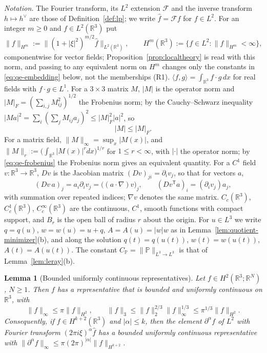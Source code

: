 \documentclass[11pt]{article}
\newtheorem{lemma}[theorem]{Lemma}
\theoremstyle{definition}
\theoremstyle{plain}
\newcommand{\R}{\mathbb R}
\newcommand{\norm}[1]{\lVert #1\rVert}
\begin{document}
\emph{Notation.}  The Fourier transform, its $L^2$ extension $\mathcal F$
and the inverse transform $h\mapsto h^\vee$ are those of
Definition~\ref{def:lp}; we write $\hat f=\mathcal Ff$ for $f\in L^2$.
For an integer $m\ge0$ and $f\in L^2(\R^3)$ put
\begin{equation}\label{eq:qe-sobolev-norm}
 \norm f_{H^m}:=\norm{(1+|\xi|^2)^{m/2}\hat f}_{L^2(\R^3)},
 \qquad H^m(\R^3):=\{f\in L^2:\norm f_{H^m}<\infty\},
\end{equation}
componentwise for vector fields; Proposition~\ref{prop:localtheory} is read
with this norm, and passing to any equivalent norm on $H^m$ changes only the
constants in \eqref{eq:qe-embedding} below, not the memberships (R1).
$\langle f,g\rangle=\int_{\R^3}f\cdot g\,dx$ for real fields with
$f\cdot g\in L^1$.  For a $3\times3$ matrix $M$, $|M|$ is the operator norm
and $|M|_F=(\sum_{i,j}M_{ij}^2)^{1/2}$ the Frobenius norm; by the
Cauchy--Schwarz inequality $|Ma|^2=\sum_i(\sum_jM_{ij}a_j)^2\le|M|_F^2|a|^2$,
so
\begin{equation}\label{eq:qe-frobenius}
 |M|\le|M|_F .
\end{equation}
For a matrix field, $\norm{M}_\infty=\sup_x|M(x)|$,
and $\norm M_r:=\bigl(\int_{\R^3}|M(x)|^r dx\bigr)^{1/r}$ for
$1\le r<\infty$, with $|\cdot|$ the operator norm; by
\eqref{eq:qe-frobenius} the Frobenius norm gives an equivalent
quantity.  For a
$C^1$ field $v:\R^3\to\R^3$, $Dv$ is the Jacobian matrix
$(Dv)_{ji}=\partial_iv_j$, so that for vectors $a$,
\begin{equation}\label{eq:qe-jacobian}
 (Dv\,a)_j=a_i\partial_iv_j=\bigl((a\cdot\nabla)v\bigr)_j,
 \qquad
 (Dv^{\mathsf T}a)_i=(\partial_iv_j)a_j ,
\end{equation}
with summation over repeated indices; $\nabla v$ denotes the same matrix.
$C_c(\R^3)$, $C^1_c(\R^3)$, $C_c^\infty(\R^3)$ are the continuous, $C^1$,
smooth functions with compact support, and $B_r$ is the open ball of radius
$r$ about the origin.  For $u\in L^3$ we write $q=q(u)$, $w=w(u)=u+q$,
$A=A(u)=|w|w$ as in Lemma~\ref{lem:quotient-minimizer}(b), and along the
solution $q(t)=q(u(t))$, $w(t)=w(u(t))$, $A(t)=A(u(t))$.  The constant
$C_{\mathbb P}=\norm{\mathbb P}_{L^3\to L^3}$ is that of
Lemma~\ref{lem:leray}(b).

\begin{lemma}[Bounded uniformly continuous representatives]
\label{lem:qe-embedding}
Let $f\in H^2(\R^3;\R^N)$, $N\ge1$.  Then $f$ has a representative that is bounded and
uniformly continuous on $\R^3$, with
\begin{equation}\label{eq:qe-embedding}
 \norm f_\infty\le\pi\norm f_{H^2},
 \qquad
 \norm f_3\le\norm f_2^{2/3}\norm f_\infty^{1/3}\le\pi^{1/3}\norm f_{H^2}.
\end{equation}
Consequently, if $f\in H^{k+2}(\R^3)$ and $|\alpha|\le k$, then the
element $\partial^\alpha f$ of $L^2$ with Fourier transform
$(2\pi i\xi)^\alpha\hat f$ has a bounded uniformly continuous
representative with
$\norm{\partial^\alpha f}_\infty\le\pi(2\pi)^{|\alpha|}\norm f_{H^{k+2}}$.
\end{lemma}
\end{document}
